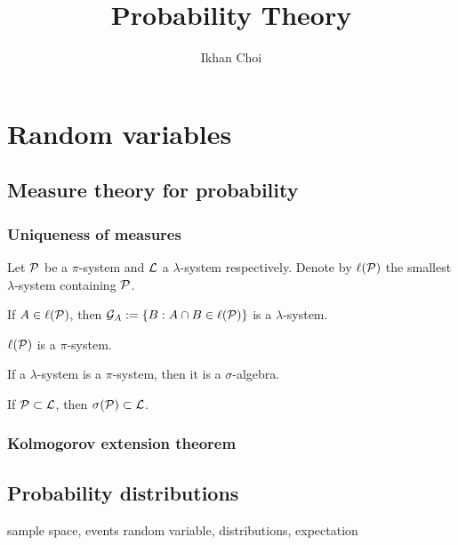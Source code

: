 \documentclass{../note}
\begin{document}
\title{Probability Theory}
\author{Ikhan Choi}
\maketitle
\tableofcontents


\part{Random variables}
\chapter{Measure theory for probability}

\section{Uniqueness of measures}
\begin{prb}
Let $\mathcal{P}$ be a $\pi$-system and $\mathcal{L}$ a $\lambda$-system respectively.
Denote by $\ell(\mathcal{P})$ the smallest $\lambda$-system containing $\mathcal{P}$.
\begin{parts}
\item If $A\in\ell(\mathcal{P})$, then $\mathcal{G}_A:=\{B:A\cap B\in\ell(\mathcal{P})\}$ is a $\lambda$-system.
\item $\ell(\mathcal{P})$ is a $\pi$-system.
\item If a $\lambda$-system is a $\pi$-system, then it is a $\sigma$-algebra.
\item If $\mathcal{P}\subset\mathcal{L}$, then $\sigma(\mathcal{P})\subset\mathcal{L}$.
\end{parts}
\end{prb}

\begin{prb}
\end{prb}

\section{Kolmogorov extension theorem}










\chapter{Probability distributions}

sample space, events
random variable, distributions, expectation
\end{document}

